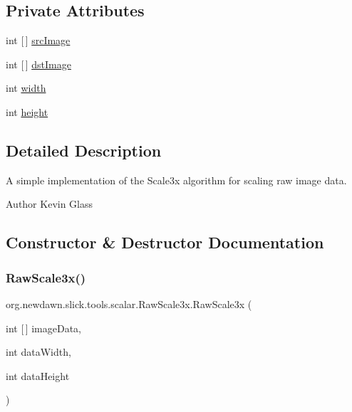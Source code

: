 \subsection*{Private Attributes}
\begin{DoxyCompactItemize}
\item 
int \mbox{[}$\,$\mbox{]} \mbox{\hyperlink{classorg_1_1newdawn_1_1slick_1_1tools_1_1scalar_1_1_raw_scale3x_a63a783ac3e746edbd747992b581f8e52}{src\+Image}}
\item 
int \mbox{[}$\,$\mbox{]} \mbox{\hyperlink{classorg_1_1newdawn_1_1slick_1_1tools_1_1scalar_1_1_raw_scale3x_a998733a4f10166751b3dffd5be4f33f1}{dst\+Image}}
\item 
int \mbox{\hyperlink{classorg_1_1newdawn_1_1slick_1_1tools_1_1scalar_1_1_raw_scale3x_a755ece4afefc43bbcd0e0b7757e20ce2}{width}}
\item 
int \mbox{\hyperlink{classorg_1_1newdawn_1_1slick_1_1tools_1_1scalar_1_1_raw_scale3x_a67f5f9e7b2f4e0be9915463c29eb1b7d}{height}}
\end{DoxyCompactItemize}


\subsection{Detailed Description}
A simple implementation of the Scale3x algorithm for scaling raw image data.

\begin{DoxyAuthor}{Author}
Kevin Glass 
\end{DoxyAuthor}


\subsection{Constructor \& Destructor Documentation}
\mbox{\label{classorg_1_1newdawn_1_1slick_1_1tools_1_1scalar_1_1_raw_scale3x_a4b34c8f0de69852f5f7bca5e398e5cf9}} 
\subsubsection{\texorpdfstring{Raw\+Scale3x()}{RawScale3x()}}
{\footnotesize\ttfamily org.\+newdawn.\+slick.\+tools.\+scalar.\+Raw\+Scale3x.\+Raw\+Scale3x (\begin{DoxyParamCaption}\item[{int \mbox{[}$\,$\mbox{]}}]{image\+Data,  }\item[{int}]{data\+Width,  }\item[{int}]{data\+Height }\end{DoxyParamCaption})\hspace{0.3cm}{\ttfamily [inline]}}


